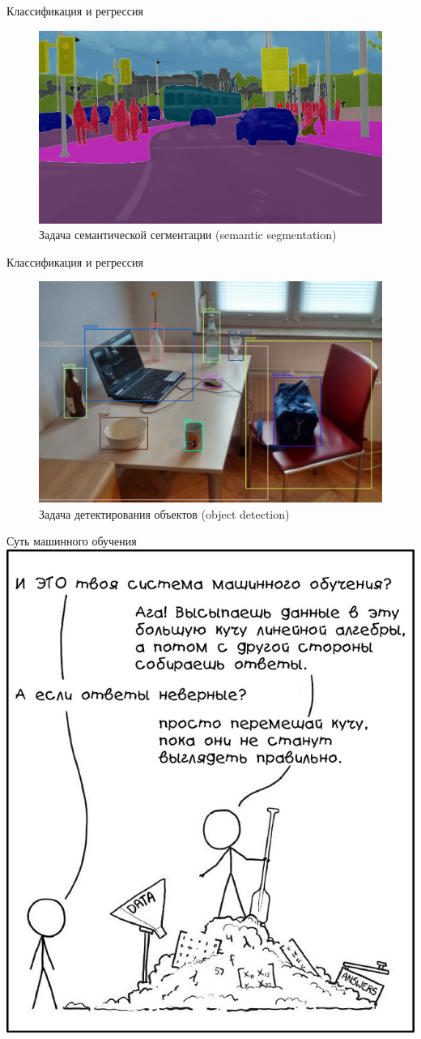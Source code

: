 \documentclass[aspectratio=169]{beamer}
\begin{document}
\begin{frame}{Классификация и регрессия}
    \begin{figure}
        \centering
        \includegraphics[width=.69\linewidth]{graphs/fig32.jpg}
        \caption*{Задача семантической сегментации (semantic segmentation)}
    \end{figure}
\end{frame}

\begin{frame}{Классификация и регрессия}
    \begin{figure}
        \centering
        \includegraphics[width=.6\linewidth]{graphs/fig33.jpg}
        \caption*{Задача детектирования объектов (object detection)}
    \end{figure}
\end{frame}

\begin{frame}{Суть машинного обучения}
    \centering
    \includegraphics[width=.4\linewidth]{graphs/fig34.jpg}
\end{frame}
\end{document}
